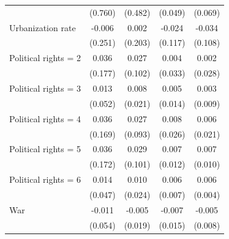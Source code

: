 \begin{table}[htbp]
\begin{tabular}{lcccc}
                                 & (0.760)                              & (0.482)                            & (0.049)     & (0.069)\\   
      Urbanization rate          & -0.006                               & 0.002                              & -0.024      & -0.034\\   
                                 & (0.251)                              & (0.203)                            & (0.117)     & (0.108)\\   
      Political rights = 2       & 0.036                                & 0.027                              & 0.004       & 0.002\\   
                                 & (0.177)                              & (0.102)                            & (0.033)     & (0.028)\\   
      Political rights = 3       & 0.013                                & 0.008                              & 0.005       & 0.003\\   
                                 & (0.052)                              & (0.021)                            & (0.014)     & (0.009)\\   
      Political rights = 4       & 0.036                                & 0.027                              & 0.008       & 0.006\\   
                                 & (0.169)                              & (0.093)                            & (0.026)     & (0.021)\\   
      Political rights = 5       & 0.036                                & 0.029                              & 0.007       & 0.007\\   
                                 & (0.172)                              & (0.101)                            & (0.012)     & (0.010)\\   
      Political rights = 6       & 0.014                                & 0.010                              & 0.006       & 0.006\\   
                                 & (0.047)                              & (0.024)                            & (0.007)     & (0.004)\\   
      War                        & -0.011                               & -0.005                             & -0.007      & -0.005\\   
                                 & (0.054)                              & (0.019)                            & (0.015)     & (0.008)\\   

\end{tabular}
\end{table}
